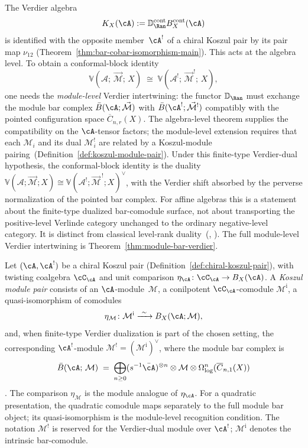 \begin{remark}
\label{rem:conformal-blocks-koszul}
The Verdier algebra
\[
 K_X(\cA):=\mathbb{D}_{\Ran}^{\mathrm{cont}}
 B_X^{\mathrm{cont}}(\cA)
\]
is identified with the opposite member~$\cA^!$ of a chiral Koszul
pair by its pair map $\nu_{12}$
(Theorem~\ref{thm:bar-cobar-isomorphism-main}).  This acts at the
algebra level. To obtain a conformal-block identity
\[
\mathbb{V}(\mathcal{A};\, \vec{\mathcal{M}};\, X)
\;\cong\;
\mathbb{V}(\mathcal{A}^!;\, \vec{\mathcal{M}}^!;\, X),
\]
one needs the \emph{module-level} Verdier intertwining: the functor
$\mathbb{D}_{\Ran}$ must exchange the module bar complex
$\bar{B}(\cA; \vec{\mathcal{M}})$ with
$\bar{B}(\cA^!; \vec{\mathcal{M}}^!)$ compatibly with the
pointed configuration space
$\overline{C}_{n,r}(X)$. The algebra-level theorem
supplies the compatibility on the $\cA$-tensor factors; the
module-level extension requires that each $\mathcal{M}_i$ and its
dual $\mathcal{M}_i^!$ are related by a Koszul-module
pairing~(Definition~\ref{def:koszul-module-pair}). Under this
finite-type Verdier-dual hypothesis, the conformal-block identity
is the duality
$\mathbb{V}(\mathcal{A};\vec{\mathcal M};X)
\cong
\mathbb{V}(\mathcal{A}^!;\vec{\mathcal M}^{\,!};X)^\vee$,
with the Verdier shift absorbed by the perverse normalization of the
pointed bar complex. For affine algebras this is a statement about
the finite-type dualized bar-comodule surface, not about transporting the
positive-level Verlinde category unchanged to the ordinary
negative-level category. It is distinct from classical level-rank
duality~(\cite{Beauville}, \cite{NakanishiTsuchiya}). The full
module-level Verdier intertwining is
Theorem~\ref{thm:module-bar-verdier}.
\end{remark}

\begin{definition}\label{def:koszul-module-pair}
Let $(\cA, \cA^!)$ be a chiral Koszul pair
(Definition~\ref{def:chiral-koszul-pair}), with twisting coalgebra
$\cC_{\cA}$ and unit comparison
$\eta_{\cA}\colon\cC_{\cA}\to B_X(\cA)$.  A
\emph{Koszul module pair} consists of an $\cA$-module~$\mathcal{M}$,
a conilpotent $\cC_{\cA}$-comodule
$\mathcal{M}^{\mathrm{i}}$, a quasi-isomorphism of comodules
\[
 \eta_{\mathcal M}\colon\mathcal M^{\mathrm i}
 \xrightarrow{\ \sim\ }B_X(\cA;\mathcal M),
\]
and, when finite-type Verdier
dualization is part of the chosen setting, the corresponding
$\cA^!$-module $\mathcal{M}^!=(\mathcal{M}^{\mathrm{i}})^\vee$,
where the module bar complex is
\[
\bar{B}(\cA;\, \mathcal{M})
\;=\;
\bigoplus_{n \ge 0}
(s^{-1}\bar{\cA})^{\otimes n} \otimes \mathcal{M}
\otimes \Omega^n_{\log}(\overline{C}_{n,1}(X))
\].
The comparison $\eta_{\mathcal M}$ is the module analogue of
$\eta_{\cA}$.  For a quadratic presentation, the quadratic comodule
maps separately to the full module bar object; its quasi-isomorphism
is the module-level recognition condition.  The notation
$\mathcal{M}^!$ is reserved for the Verdier-dual module over
$\cA^!$; $\mathcal M^{\mathrm i}$ denotes the intrinsic
bar-comodule.
\end{definition}

